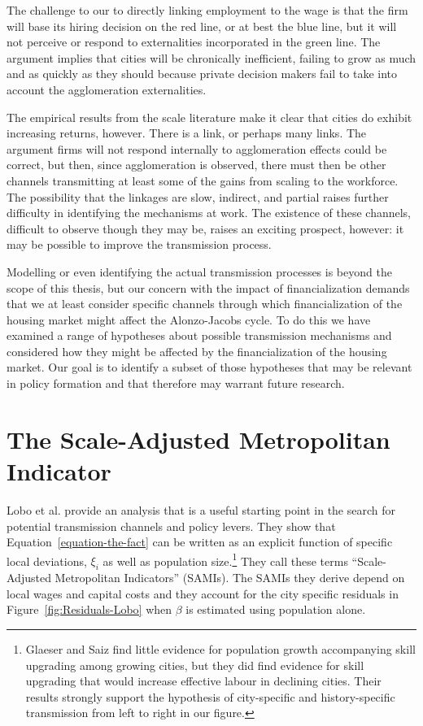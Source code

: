 The challenge to our   to directly linking employment to the wage is that the firm will base its hiring decision on the red line, or at best the blue line, but it will not perceive or  respond to externalities incorporated in the green line.  The argument implies  that cities will be chronically inefficient, failing to grow as  much and as quickly as they should because private decision makers fail to take into account the agglomeration externalities. 

The empirical results from the scale literature  make it clear that cities do exhibit increasing returns, however. There is a link, or perhaps many links. The argument firms will not respond internally to agglomeration effects could be correct, but then, since agglomeration is observed, there must then  be other channels  transmitting at least some of the gains from scaling to the workforce. The possibility that the linkages are slow, indirect, and partial raises further difficulty in identifying the mechanisms at work.  The existence of these channels, difficult to observe though they may be, raises an exciting prospect, however: it may be possible to improve the  transmission process. 


Modelling or even identifying  the actual transmission processes is beyond the scope of this thesis, but our concern with the impact of financialization demands that we at least consider specific channels through which financialization of the housing market might affect the Alonzo-Jacobs cycle. To do this we have examined a range of hypotheses about possible transmission mechanisms and considered how they might be affected by the financialization of the housing market. Our goal is to identify a subset of those hypotheses that may be relevant in policy formation and that therefore may warrant future research.



\section{The Scale-Adjusted Metropolitan Indicator}

 Lobo et al.\cite{loboUrbanScalingProduction2013} provide an  analysis that is a useful starting point in the search for potential transmission channels and policy levers. They show that Equation~\ref{equation-the-fact} can be written as an explicit  function of specific local deviations, $\xi_i$ 
 as well as population size.\footnote{
Glaeser and Saiz \cite{glaeserRiseSkilledCity2003} find little evidence for population growth accompanying skill upgrading among growing cities,  but they did find  evidence for skill upgrading that would increase effective labour in declining cities. Their results strongly  support the hypothesis of city-specific  and history-specific transmission from left to right in our figure.}  
They  call these terms ``Scale-Adjusted Metropolitan Indicators'' (SAMIs). The SAMIs they derive depend on local wages and capital costs and they account for the city specific residuals in Figure~\ref{fig:Residuals-Lobo} when $\beta$ is estimated using population alone. 
 
